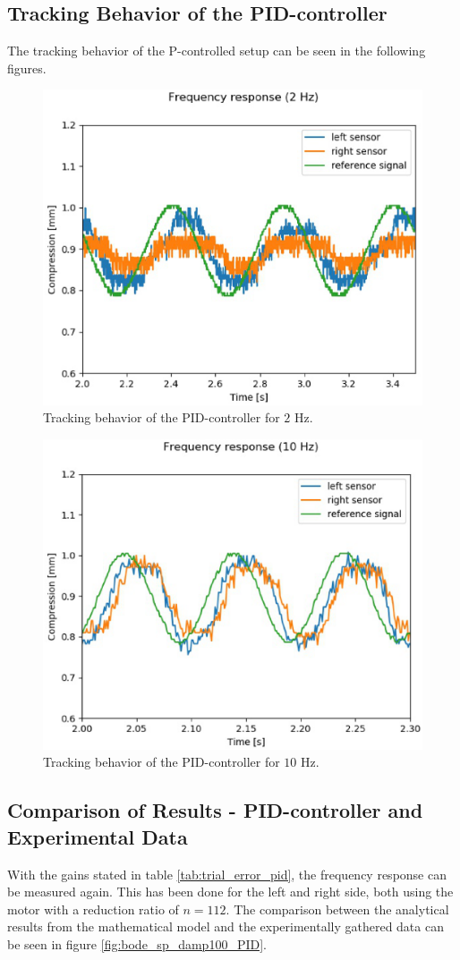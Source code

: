 \subsection{Tracking Behavior of the PID-controller}
The tracking behavior of the P-controlled setup can be seen in the following figures.
\begin{figure}[h!]
	\centering
	\includegraphics[width=0.6\linewidth]{Figs/2plot_zoom_PID}
	\caption{Tracking behavior of the PID-controller for $2$ Hz.}
	\label{fig:2plot_zoom_PID}
\end{figure}
\begin{figure}[h!]
	\centering
	\includegraphics[width=0.6\linewidth]{Figs/10plot_zoom_PID}
	\caption{Tracking behavior of the PID-controller for $10$ Hz.}
	\label{fig:10plot_zoom_PID}
\end{figure}

\subsection{Comparison of Results - PID-controller and Experimental Data}
With the gains stated in table \ref{tab:trial_error_pid}, the frequency response can be measured again. This has been done for the left and right side, both using the motor with a reduction ratio of $n = 112$. The comparison between the analytical results from the mathematical model and the experimentally gathered data can be seen in figure \ref{fig:bode_sp_damp100_PID}.


